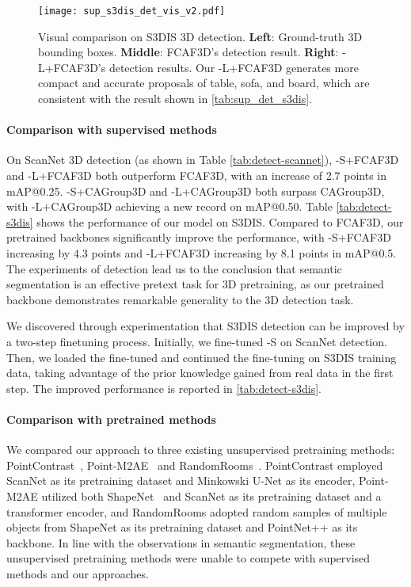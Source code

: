 \documentclass[10pt,twocolumn,letterpaper]{article}
\begin{document}
\begin{figure}[t]
    \centering
    \texttt{[image: sup\_s3dis\_det\_vis\_v2.pdf]}
    \caption{Visual comparison on S3DIS 3D detection. \textbf{Left}: Ground-truth 3D bounding boxes. \textbf{Middle}: FCAF3D's detection result. \textbf{Right}: {\SST}-L+FCAF3D's detection results. Our {\SST-L}+FCAF3D generates more compact and accurate proposals of table, sofa, and board, which are consistent with the result shown in \cref{tab:sup_det_s3dis}.}
    \label{fig:s3dis_det_vis}
\end{figure}

\paragraph{Comparison with supervised methods}
On ScanNet 3D detection (as shown in Table \ref{tab:detect-scannet}), {\SST}-S+FCAF3D and {\SST}-L+FCAF3D both outperform FCAF3D, with an increase of 2.7 points in mAP@0.25. {\SST}-S+CAGroup3D and {\SST}-L+CAGroup3D both surpass CAGroup3D, with {\SST}-L+CAGroup3D achieving a new record on mAP@0.50. Table \ref{tab:detect-s3dis} shows the performance of our model on S3DIS. Compared to FCAF3D, our pretrained backbones significantly improve the performance, with {\SST}-S+FCAF3D increasing by 4.3 points and {\SST}-L+FCAF3D increasing by 8.1 points in mAP@0.5.
The experiments of detection lead us to the conclusion that semantic segmentation is an effective pretext task for 3D pretraining, as our pretrained backbone demonstrates remarkable generality to the 3D detection task.

 We discovered through experimentation that S3DIS detection can be improved by a two-step finetuning process. Initially, we fine-tuned {\SST}-S on ScanNet detection. Then, we loaded the fine-tuned {\SST} and continued the fine-tuning on S3DIS training data, taking advantage of the prior knowledge gained from real data in the first step. The improved performance is reported in \cref{tab:detect-s3dis}.

\paragraph{Comparison with pretrained methods}
We compared our approach to three existing unsupervised pretraining methods: PointContrast~\cite{Xie2020}, Point-M2AE~\cite{zhang2022point} and RandomRooms~\cite{rao2021randomrooms}. PointContrast employed ScanNet as its pretraining dataset and Minkowski U-Net as its encoder, Point-M2AE utilized both ShapeNet~\cite{shapenet2015} and ScanNet as its pretraining dataset and a transformer encoder, and RandomRooms adopted random samples of multiple objects from ShapeNet as its pretraining dataset and PointNet++ as its backbone. In line with the observations in semantic segmentation, these unsupervised pretraining methods were unable to compete with supervised methods and our approaches.
\end{document}
